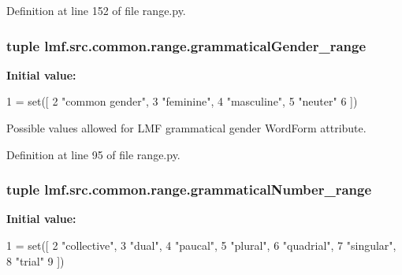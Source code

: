 Definition at line 152 of file range.\+py.

\hypertarget{namespacelmf_1_1src_1_1common_1_1range_ad872b4a301271d86df2980b34e15ffc4}{
\subsubsection[{grammatical\+Gender\+\_\+range}]{\setlength{\rightskip}{0pt plus 5cm}tuple lmf.\+src.\+common.\+range.\+grammatical\+Gender\+\_\+range}}\label{namespacelmf_1_1src_1_1common_1_1range_ad872b4a301271d86df2980b34e15ffc4}
{\bfseries Initial value\+:}
\begin{DoxyCode}
1 = set([
2     \textcolor{stringliteral}{"common gender"},
3     \textcolor{stringliteral}{"feminine"},
4     \textcolor{stringliteral}{"masculine"},
5     \textcolor{stringliteral}{"neuter"}
6 ])
\end{DoxyCode}


Possible values allowed for L\+M\+F grammatical gender Word\+Form attribute. 



Definition at line 95 of file range.\+py.

\hypertarget{namespacelmf_1_1src_1_1common_1_1range_ae3353d03f04380d7379bd193af24a1ad}{
\subsubsection[{grammatical\+Number\+\_\+range}]{\setlength{\rightskip}{0pt plus 5cm}tuple lmf.\+src.\+common.\+range.\+grammatical\+Number\+\_\+range}}\label{namespacelmf_1_1src_1_1common_1_1range_ae3353d03f04380d7379bd193af24a1ad}
{\bfseries Initial value\+:}
\begin{DoxyCode}
1 = set([
2     \textcolor{stringliteral}{"collective"},
3     \textcolor{stringliteral}{"dual"},
4     \textcolor{stringliteral}{"paucal"},
5     \textcolor{stringliteral}{"plural"},
6     \textcolor{stringliteral}{"quadrial"},
7     \textcolor{stringliteral}{"singular"},
8     \textcolor{stringliteral}{"trial"}
9 ])
\end{DoxyCode}



